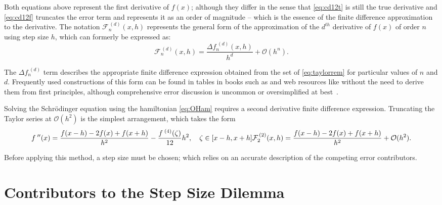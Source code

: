 Both equations above represent the first derivative of $f(x)$; although they differ in the sense that \cref{eq:cd12t} is still the true derivative and \cref{eq:cd12f} truncates the error term and represents it as an order of magnitude -- which is the essence of the finite difference approximation to the derivative.
The notation $\mathcal{F}_n^{\,(d)}(x,h)$ represents the general form of the approximation of the $d^{th}$ derivative of $f(x)$ of order $n$ using step size $h$, which can formerly be expressed as:
\begin{equation}
\mathcal{F}_n^{\,(d)}(x,h) = \frac{\Delta f_n^{\;(d)}(x,h)}{h^d} + \mathcal{O}(h^n).\label{eq:cdgeneral}
\end{equation}

The $\Delta f_n^{\;(d)}$ term describes the appropriate finite difference expression obtained from the set of \cref{eq:taylorrem} for particular values of $n$ and $d$.
Frequently used constructions of this form can be found in tables in books such as \citeauthor{Mathews2004} and web resources like \citeauthor{Holoborodko2009} without the need to derive them from first principles, although comprehensive error discussion is uncommon or oversimplified at best~\cite{Mathews2004,Holoborodko2009}.

Solving the Schr\"{o}dinger equation using the hamiltonian \cref{eq:OHam} requires a second derivative finite difference expression.
Truncating the Taylor series at $\mathcal{O}(h^2)$ is the simplest arrangement, which takes the form
\begin{equation}
f^{\;\prime\prime}(x) = \frac{f(x-h)-2f(x)+f(x+h)}{h^2} - \frac{f^{\;(4)}(\zeta)}{12}h^2, \quad \zeta \in [x-h,x+h]\label{eq:cd22t} \\
\mathcal{F}_2^{\,(2)}(x,h) = \frac{f(x-h)-2f(x)+f(x+h)}{h^2} + \mathcal{O}(h^2).\label{eq:cd22f}
\end{equation}

Before applying this method, a step size must be chosen; which relies on an accurate description of the competing error contributors.

\section[Step Size Dilemma]{Contributors to the Step Size Dilemma}


